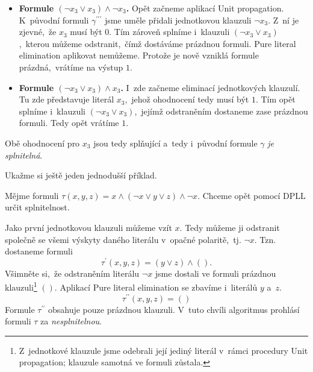 \begin{example}
    \begin{itemize}
        \item \textbf{Formule $(\neg x_3\lor x_3)\land\neg x_3$.} Opět začneme aplikací Unit propagation. K~původní formuli $\gamma^{\prime\prime\prime}$ jsme uměle přidali jednotkovou klauzuli $\neg x_3$. Z~ní je zjevné,~že $x_3$ musí být $0$. Tím zároveň splníme i~klauzuli $(\neg x_3\lor x_3)$,~kterou můžeme odstranit,~čímž dostáváme prázdnou formuli. Pure literal elimination aplikovat nemůžeme. Protože je nově vzniklá formule prázdná,~vrátíme na výstup $1$.
        \item \textbf{Formule $(\neg x_3\lor x_3)\land x_3$.} I~zde začneme eliminací jednotkových klauzulí. Tu zde představuje literál $x_3$,~jehož ohodnocení tedy musí být $1$. Tím opět splníme i~klauzuli $(\neg x_3\lor x_3)$,~jejímž odstraněním dostaneme zase prázdnou formuli. Tedy opět vrátíme $1$.
    \end{itemize}
    Obě ohodnocení pro $x_3$ jsou tedy splňující a~tedy i~původní formule $\gamma$ \emph{je splnitelná}.
\end{example}

Ukažme si ještě jeden jednodušší příklad.
\begin{example}
    Mějme formuli $\tau(x,y,z)=x\land (\neg x\lor y\lor z)\land \neg x$. Chceme opět pomocí DPLL určit splnitelnost.

    Jako první jednotkovou klauzuli můžeme vzít $x$. Tedy můžeme ji odstranit společně se všemi výskyty daného literálu v~opačné polaritě,~tj. $\neg x$. Tzn. dostaneme formuli
    \[\tau^\prime(x,y,z)=(y\lor z)\land().\]
    Všimněte si,~že odstraněním literálu $\neg x$ jsme dostali ve formuli prázdnou klauzuli\footnote{Z~jednotkové klauzule jsme odebrali její jediný literál v~rámci procedury Unit propagation; klauzule samotná ve formuli zůstala.} $()$. Aplikací Pure literal elimination se zbavíme i~literálů $y$ a~$z$.
    \[\tau^{\prime\prime}(x,y,z)=()\]
    Formule $\tau^{\prime\prime}$ obsahuje pouze prázdnou klauzuli. V~tuto chvíli algoritmus prohlásí formuli $\tau$ za \emph{nesplnitelnou}.
\end{example}

